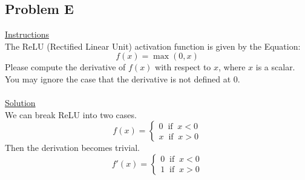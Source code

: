 \documentclass[12pt]{article}
\begin{document}
\subsection{Problem E}
\underline{Instructions}
~\\
The ReLU (Rectified Linear Unit) activation function is given by the Equation:
\begin{equation}
    \label{ReLU}
    f(x) = \max(0, x)
\end{equation}
Please compute the derivative of $f(x)$ with respect to $x$, where $x$ is a scalar. 
You may ignore the case that the derivative is not defined at 0.
~\\
~\\
\underline{Solution}
~\\
We can break ReLU into two cases. 
\begin{equation*}
    f(x) = 
    \begin{cases}
        0 \; \; \text{if} \; \; x < 0 \\
        x \; \; \text{if} \; \; x > 0
    \end{cases}
\end{equation*}
Then the derivation becomes trivial.
\begin{equation*}
    f'(x) = 
    \begin{cases}
        0 \; \; \text{if} \; \; x < 0 \\
        1 \; \; \text{if} \; \; x > 0
    \end{cases}
\end{equation*}

\end{document}
